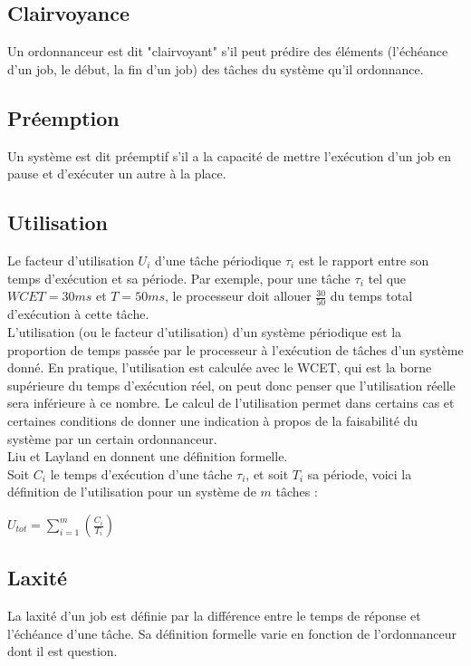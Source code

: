 \documentclass[11pt,a4paper,oneside]{report}
\begin{document}
\subsection{Clairvoyance}
Un ordonnanceur est dit "clairvoyant" s'il peut prédire des éléments (l'échéance d'un job, 
le début, la fin d'un job) des tâches du système qu'il ordonnance.

\subsection{Préemption} 
Un système est dit préemptif s'il a la capacité 
	de mettre l'exécution d'un job en pause et d'exécuter un autre à la place. 

\subsection{Utilisation}
Le facteur d'utilisation $U_i$ d'une tâche périodique $\tau_i$ est le rapport entre 
son temps d'exécution et sa période. Par exemple, pour une tâche $\tau_i$ tel que 
$WCET = 30 ms$ et $T = 50 ms$, le processeur doit allouer $\frac{30}{50}$ du temps 
total d'exécution à cette tâche.\\

L'utilisation (ou le facteur d'utilisation) d'un système périodique est la proportion de temps 
passée par le processeur à l'exécution de tâches d'un système donné. En pratique, l'utilisation 
est calculée avec le WCET, qui est la borne supérieure du temps d'exécution réel, on 
peut donc penser que l'utilisation réelle sera inférieure à ce nombre.
Le calcul de l'utilisation permet dans certains cas et certaines conditions de donner une indication 
à propos de la faisabilité du système par un certain ordonnanceur. 
\\

Liu et Layland \cite{liu_scheduling_1973} en donnent une définition formelle.\\ 

Soit $C_i$ le temps d'exécution d'une tâche $\tau_i$, et soit $T_i$ sa période, voici la définition de 
l'utilisation pour un système de $m$ tâches :\\
\begin{center}
	$U_{tot} = \sum_{i = 1}^{m}(\frac{C_i}{T_i})$
\end{center}

\subsection{Laxité}
La laxité d'un job est définie par la différence entre le temps de réponse et l'échéance 
d'une tâche. Sa définition formelle varie en fonction de l'ordonnanceur dont il est question.
\end{document}

